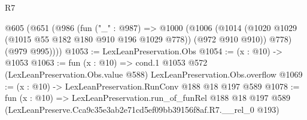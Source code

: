 \begin{lexlean}{R7}
\begin{coremodule}
  @605
    (@651
      (@986
        (fun ("_" : @987) =>
        @1000
          (@1006
            (@1014 (@1020 @1029 (@1015 @55 @182 @180 @910 @196 @1029 @778)) (@972 @910 @910))
            @778)
          (@979 @995))))
@1053 := LexLeanPreservation.Obs
@1054 := (x : @10) -> @1053
@1063 := fun (x : @10) =>
  cond.{1} @1053 @572 (LexLeanPreservation.Obs.value @588) LexLeanPreservation.Obs.overflow
@1069 := (x : @10) -> LexLeanPreservation.RunConv @188 @18 @197 @589
@1078 := fun (x : @10) =>
  LexLeanPreservation.run_of_funRel
    @188
    @18
    @197
    @589
    (LexLeanPreserve.Cca9c35e3ab2e71cd5ef09bb39156f8af.R7.__rel_0 @193)
\end{coremodule}
\end{lexlean}
